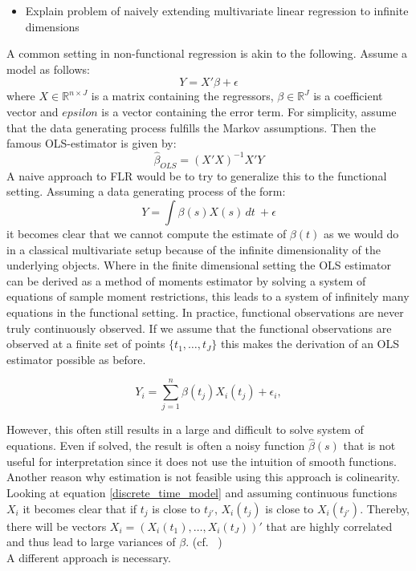 \documentclass[11pt,twoside,a4paper]{article}
\begin{document}
	\begin{itemize}
		\item Explain problem of naively extending multivariate linear regression to infinite dimensions
	\end{itemize}
	A common setting in non-functional regression is akin to the following. Assume a model as follows:
	\begin{equation}
		Y = X'\beta + \epsilon
	\end{equation}
	where $X \in \mathbb{R}^{n\times J}$ is a matrix containing the regressors, $\beta \in \mathbb{R}^J$ is a coefficient vector and $epsilon$ is a vector containing the error term. For simplicity, assume that the data generating process fulfills the Markov assumptions. Then the famous OLS-estimator is given by:
	\begin{equation}
		\hat{\beta}_{OLS} = (X'X)^{-1}X'Y
	\end{equation}
	A naive approach to FLR would be to try to generalize this to the functional setting.
	Assuming a data generating process of the form:
	\begin{equation}
     Y =  \int \beta(s)X(s) \,dt \ +\epsilon
    \end{equation}
    it becomes clear that we cannot compute the estimate of $\beta(t)$ as we would do in a classical multivariate setup because of the infinite dimensionality of the underlying objects. Where in the finite dimensional setting the OLS estimator can be derived as a method of moments estimator by solving a system of equations of sample moment restrictions, this leads to a system of infinitely many equations in the functional setting. 
    In practice, functional observations are never truly continuously observed. If we assume that the functional observations are observed at a finite set of points $\{t_1, \dots, t_J\}$ this makes the derivation of an OLS estimator possible as before.
    
    \begin{equation}\label{discrete_time_model}
    	Y_i = \sum_{j = 1}^{n} \beta(t_{j})X_i(t_{j}) + \epsilon_{i},
    \end{equation}

    However, this often still results in a large and difficult to solve system of equations. Even if solved, the result is often a noisy function $\hat{\beta}(s)$ that is not useful for interpretation since it does not use the intuition of smooth functions. Another reason why estimation is not feasible using this approach is colinearity.
    Looking at equation \ref{discrete_time_model} and assuming continuous functions $X_i$ it becomes clear that if $t_{j}$ is close to $t_{j'}$, $X_{i}(t_{j})$ is close to $X_{i}(t_{j'})$. Thereby, there will be vectors $X_{i} = (X_i(t_1), \dots, X_i(t_J))'$ that are highly correlated and thus lead to large variances of $\beta$. (cf. ~\cite{kokoszka_introduction_2017})\\
    A different approach is necessary.
    
\end{document}
